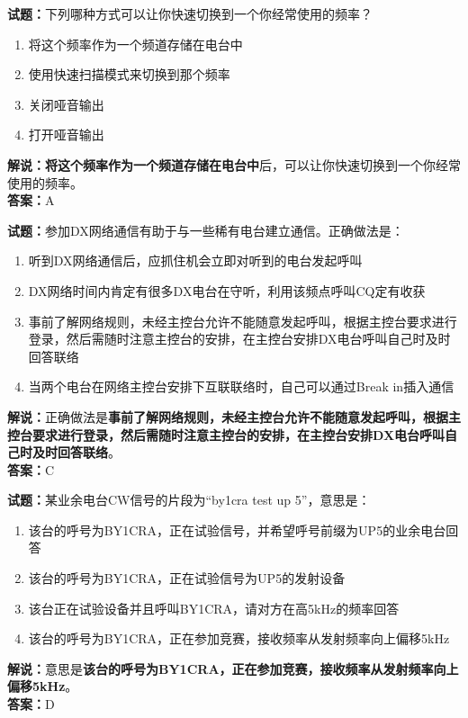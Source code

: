 \documentclass{ctexbook}
\begin{document}
\bigskip

\noindent\textbf{试题：}下列哪种方式可以让你快速切换到一个你经常使用的频率？
\begin{enumerate}[leftmargin=3em]
  \item 将这个频率作为一个频道存储在电台中
  \item 使用快速扫描模式来切换到那个频率
  \item 关闭哑音输出
  \item 打开哑音输出
\end{enumerate}
\noindent\textbf{解说：}\textbf{将这个频率作为一个频道存储在电台中}后，可以让你快速切换到一个你经常使用的频率。\\\noindent\textbf{答案：}A

\bigskip

\noindent\textbf{试题：}参加DX网络通信有助于与一些稀有电台建立通信。正确做法是：
\begin{enumerate}[leftmargin=3em]
  \item 听到DX网络通信后，应抓住机会立即对听到的电台发起呼叫
  \item DX网络时间内肯定有很多DX电台在守听，利用该频点呼叫CQ定有收获
  \item 事前了解网络规则，未经主控台允许不能随意发起呼叫，根据主控台要求进行登录，然后需随时注意主控台的安排，在主控台安排DX电台呼叫自己时及时回答联络
  \item 当两个电台在网络主控台安排下互联联络时，自己可以通过Break in插入通信
\end{enumerate}
\noindent\textbf{解说：}正确做法是\textbf{事前了解网络规则，未经主控台允许不能随意发起呼叫，根据主控台要求进行登录，然后需随时注意主控台的安排，在主控台安排DX电台呼叫自己时及时回答联络}。\\\noindent\textbf{答案：}C

\bigskip

\noindent\textbf{试题：}某业余电台CW信号的片段为“by1cra test up 5”，意思是：
\begin{enumerate}[leftmargin=3em]
  \item 该台的呼号为BY1CRA，正在试验信号，并希望呼号前缀为UP5的业余电台回答
  \item 该台的呼号为BY1CRA，正在试验信号为UP5的发射设备
  \item 该台正在试验设备并且呼叫BY1CRA，请对方在高5\unit{\kHz}的频率回答
  \item 该台的呼号为BY1CRA，正在参加竞赛，接收频率从发射频率向上偏移5\unit{\kHz}
\end{enumerate}
\noindent\textbf{解说：}意思是\textbf{该台的呼号为BY1CRA，正在参加竞赛，接收频率从发射频率向上偏移5\unit{\kHz}}。\\\noindent\textbf{答案：}D
\end{document}
